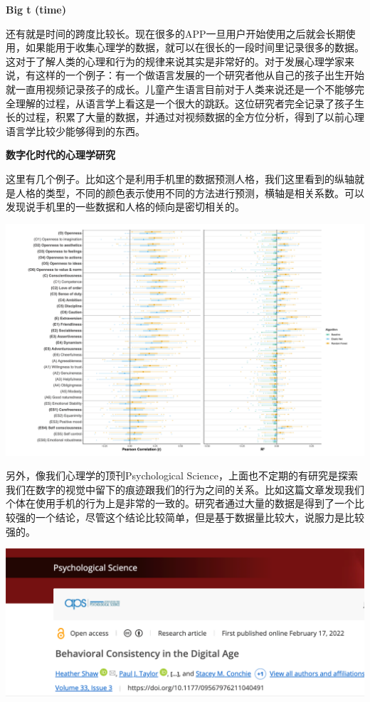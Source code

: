 \documentclass[
  oneside]{book}
\begin{document}
\textbf{Big t (time)}

还有就是时间的跨度比较长。现在很多的APP一旦用户开始使用之后就会长期使用，如果能用于收集心理学的数据，就可以在很长的一段时间里记录很多的数据。这对于了解人类的心理和行为的规律来说其实是非常好的。对于发展心理学家来说，有这样的一个例子：有一个做语言发展的一个研究者他从自己的孩子出生开始就一直用视频记录孩子的成长。儿童产生语言目前对于人类来说还是一个不能够完全理解的过程，从语言学上看这是一个很大的跳跃。这位研究者完全记录了孩子生长的过程，积累了大量的数据，并通过对视频数据的全方位分析，得到了以前心理语言学比较少能够得到的东西。

\textbf{数字化时代的心理学研究}

这里有几个例子。比如这个是利用手机里的数据预测人格，我们这里看到的纵轴就是人格的类型，不同的颜色表示使用不同的方法进行预测，横轴是相关系数。可以发现说手机里的一些数据和人格的倾向是密切相关的。

\includegraphics{1001-lesson1/image-20230302195218412.png}

另外，像我们心理学的顶刊Psychological
Science，上面也不定期的有研究是探索我们在数字的视觉中留下的痕迹跟我们的行为之间的关系。比如这篇文章发现我们个体在使用手机的行为上是非常的一致的。研究者通过大量的数据是得到了一个比较强的一个结论，尽管这个结论比较简单，但是基于数据量比较大，说服力是比较强的。

\includegraphics{1001-lesson1/image-20230302195243394.png}
\end{document}
